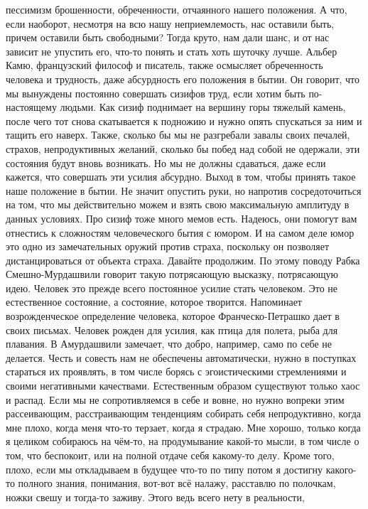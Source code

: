 пессимизм брошенности, обреченности, отчаянного нашего положения. А что, если
наоборот, несмотря на всю нашу неприемлемость, нас оставили быть, причем
оставили быть свободными? Тогда круто, нам дали шанс, и от нас зависит не
упустить его, что-то понять и стать хоть шуточку лучше. Альбер Камю, французский
философ и писатель, также осмысляет обреченность человека и трудность, даже
абсурдность его положения в бытии. Он говорит, что мы вынуждены постоянно
совершать сизифов труд, если хотим быть по-настоящему людьми. Как сизиф
поднимает на вершину горы тяжелый камень, после чего тот снова скатывается к
подножию и нужно опять спускаться за ним и тащить его наверх. Также, сколько бы
мы не разгребали завалы своих печалей, страхов, непродуктивных желаний, сколько
бы побед над собой не одержали, эти состояния будут вновь возникать. Но мы не
должны сдаваться, даже если кажется, что совершать эти усилия абсурдно. Выход в
том, чтобы принять такое наше положение в бытии. Не значит опустить руки, но
напротив сосредоточиться на том, что мы действительно можем и взять свою
максимальную амплитуду в данных условиях. Про сизиф тоже много мемов есть.
Надеюсь, они помогут вам отнестись к сложностям человеческого бытия с юмором. И
на самом деле юмор это одно из замечательных оружий против страха, поскольку он
позволяет дистанцироваться от объекта страха. Давайте продолжим. По этому поводу
Рабка Смешно-Мурдашвили говорит такую потрясающую высказку, потрясающую идею.
Человек это прежде всего постоянное усилие стать человеком. Это не естественное
состояние, а состояние, которое творится. Напоминает возрожденческое определение
человека, которое Франческо-Петрашко дает в своих письмах. Человек рожден для
усилия, как птица для полета, рыба для плавания. В Амурдашвили замечает, что
добро, например, само по себе не делается. Честь и совесть нам не обеспечены
автоматически, нужно в поступках стараться их проявлять, в том числе борясь с
эгоистическими стремлениями и своими негативными качествами. Естественным
образом существуют только хаос и распад. Если мы не сопротивляемся в себе и
вовне, но нужно вопреки этим рассеивающим, расстраивающим тенденциям собирать
себя непродуктивно, когда мне плохо, когда меня что-то терзает, когда я страдаю.
Мне хорошо, только когда я целиком собираюсь на чём-то, на продумывание какой-то
мысли, в том числе о том, что беспокоит, или на полной отдаче себя какому-то
делу. Кроме того, плохо, если мы откладываем в будущее что-то по типу потом я
достигну какого-то полного знания, понимания, вот-вот всё налажу, расставлю по
полочкам, ножки свешу и тогда-то заживу. Этого ведь всего нету в реальности,
